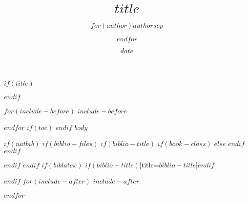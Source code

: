 \documentclass[fancyhdr,fntef,UTF8]{ctexart}
\title{$title$}
\author{$for(author)$$author$$sep$ \and $endfor$}
\date{$date$}
\begin{document}
$if(title)$
\maketitle
\newpage
$endif$

$for(include-before)$
$include-before$

$endfor$
$if(toc)$
{
\hypersetup{linkcolor=blue}
\tableofcontents
\newpage
}
$endif$
$body$

$if(natbib)$
$if(biblio-files)$
$if(biblio-title)$
$if(book-class)$
\renewcommand\bibname{$biblio-title$}
$else$
\renewcommand\refname{$biblio-title$}
$endif$
$endif$


$endif$
$endif$
$if(biblatex)$
\printbibliography$if(biblio-title)$[title=$biblio-title$]$endif$

$endif$
$for(include-after)$
$include-after$

$endfor$
\end{document}
